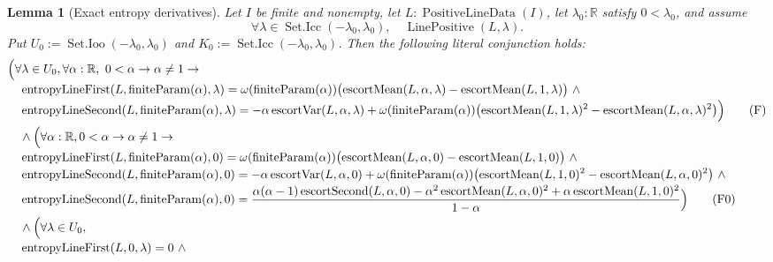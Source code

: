 \documentclass[9pt]{extarticle}
\newtheorem{lemma}{Lemma}[section]
\theoremstyle{definition}
\theoremstyle{remark}
\newcommand{\R}{\mathbb R}
\begin{document}
\begin{lemma}[Exact entropy derivatives]\label{lem:exact-derivatives}
Let $I$ be finite and nonempty, let
$L:\operatorname{PositiveLineData}(I)$, let $\lambda_0:\R$ satisfy
$0<\lambda_0$, and assume
\[
 \forall\lambda\in\operatorname{Set.Icc}(-\lambda_0,\lambda_0),\quad
 \operatorname{LinePositive}(L,\lambda).
\]
Put $U_0:=\operatorname{Set.Ioo}(-\lambda_0,\lambda_0)$ and
$K_0:=\operatorname{Set.Icc}(-\lambda_0,\lambda_0)$.  Then the following
literal conjunction holds:
\begin{align*}
 &\Bigl(\forall\lambda\in U_0,\forall\alpha:\R,\
  0<\alpha\to\alpha\neq1\to\\[-2pt]
 &\quad
  \operatorname{entropyLineFirst}
   (L,\operatorname{finiteParam}(\alpha),\lambda)
  =\omega(\operatorname{finiteParam}(\alpha))
   \bigl(\operatorname{escortMean}(L,\alpha,\lambda)
         -\operatorname{escortMean}(L,1,\lambda)\bigr)\ \wedge\\[-2pt]
 &\quad
  \operatorname{entropyLineSecond}
   (L,\operatorname{finiteParam}(\alpha),\lambda)
  =-\alpha\operatorname{escortVar}(L,\alpha,\lambda)
   +\omega(\operatorname{finiteParam}(\alpha))
    \bigl(\operatorname{escortMean}(L,1,\lambda)^2
          -\operatorname{escortMean}(L,\alpha,\lambda)^2\bigr)
 \Bigr)\tag{F}\label{eq:H-finite-general}\\
 &\quad\wedge\Bigl(\forall\alpha:\R,0<\alpha\to\alpha\neq1\to\\[-2pt]
 &\quad
  \operatorname{entropyLineFirst}
   (L,\operatorname{finiteParam}(\alpha),0)
  =\omega(\operatorname{finiteParam}(\alpha))
   \bigl(\operatorname{escortMean}(L,\alpha,0)
         -\operatorname{escortMean}(L,1,0)\bigr)\ \wedge\\[-2pt]
 &\quad
  \operatorname{entropyLineSecond}
   (L,\operatorname{finiteParam}(\alpha),0)
  =-\alpha\operatorname{escortVar}(L,\alpha,0)
   +\omega(\operatorname{finiteParam}(\alpha))
    \bigl(\operatorname{escortMean}(L,1,0)^2
          -\operatorname{escortMean}(L,\alpha,0)^2\bigr)\ \wedge\\[-2pt]
 &\quad
  \operatorname{entropyLineSecond}
   (L,\operatorname{finiteParam}(\alpha),0)
  =\frac{\alpha(\alpha-1)\operatorname{escortSecond}(L,\alpha,0)
  -\alpha^2\operatorname{escortMean}(L,\alpha,0)^2
  +\alpha\operatorname{escortMean}(L,1,0)^2}{1-\alpha}
 \Bigr)\tag{F0}\label{eq:H-finite-at-zero}\\
 &\quad\wedge\Bigl(\forall\lambda\in U_0,\\[-2pt]
 &\quad
  \operatorname{entropyLineFirst}(L,0,\lambda)=0\ \wedge\

\end{align*}
\end{lemma}
\end{document}
